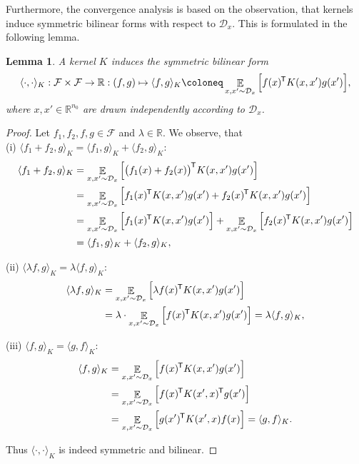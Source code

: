 \documentclass[11pt, a4paper]{article}
\newtheorem{lemma}[theorem]{Lemma}
\newcommand{\R}{\mathbb{R}}
\newcommand{\D}{\mathcal{D}}
\newcommand{\F}{\mathcal{F}}
\newcommand*{\tr}{^{\mkern-1.5mu\mathsf{T}}}
\DeclareMathOperator*{\E}{\mathbb{E}}
\begin{document}
Furthermore, the convergence analysis is based on the observation, that kernels induce symmetric bilinear forms with respect to $\D_x$. This is formulated in the following lemma.

\begin{lemma} \label{lem:form}
A kernel $K$ induces the symmetric bilinear form
\[ \langle \cdot, \cdot \rangle_K : \F \times \F \to \R : (f,g) \mapsto \langle f , g \rangle _K \coloneq \E_{x,x' \sim \D_x} \Big [ f(x)\tr  K(x,x') g(x') \Big ], \]
where $x, x' \in \R^{n_0}$ are drawn independently according to $\D_x$. 
\end{lemma}

\begin{proof}
Let $f_1, f_2, f, g \in \F$ and $\lambda \in \R$. We observe, that \\

(i) $\langle f_1 + f_2 , g \rangle_{K} = \langle f_1 , g \rangle_{K} + \langle f_2 , g \rangle_{K}$:
\[ \begin{split}
\langle f_1 + f_2 , g \rangle_{K}
&= \E_{x,x' \sim \D_x} \Big [ \big ( f_1(x) + f_2(x) \big )\tr K(x,x')g(x') \Big ] \\\
&= \E_{x,x' \sim \D_x} \Big [ f_1(x)\tr K(x,x')g(x') + f_2(x)\tr K(x,x')g(x') \Big ] \\\
&= \E_{x,x' \sim \D_x} \Big [ f_1(x)\tr K(x,x')g(x') \Big ] + \E_{x,x' \sim \D_x} \Big [ f_2(x)\tr K(x,x')g(x') \Big ] \\\
&= \langle f_1 , g \rangle_{K} + \langle f_2 , g \rangle_{K},
\end{split} \]

(ii) $\langle \lambda f , g \rangle_{K} = \lambda \langle f, g \rangle_{K}$:
\[ \begin{split} 
\langle \lambda f , g \rangle_{K} 
&= \E_{x,x' \sim \D_x} \Big [ \lambda f(x)\tr K(x,x')g(x') \Big ] \\\
&= \lambda \cdot \E_{x,x' \sim \D_x} \Big [ f(x)\tr K(x,x')g(x') \Big ] = \lambda \langle f, g \rangle_{K}, 
\end{split} \]

(iii) $\langle f , g \rangle_{K} = \langle g , f \rangle_{K}$:
\[ \begin{split} \langle f , g \rangle_{K} 
&= \E_{x,x' \sim \D_x} \Big [ f(x)\tr K(x,x')g(x') \Big ] \\\
&= \E_{x,x' \sim \D_x} \Big [ f(x)\tr K(x',x)\tr g(x') \Big ] \\\
&= \E_{x,x' \sim \D_x} \Big [ g(x')\tr K(x',x)f(x) \Big ] = \langle g , f \rangle_{K}.
\end{split} \]

Thus $\langle \cdot,\cdot \rangle_{K}$ is indeed symmetric and bilinear.
\end{proof}
\end{document}
